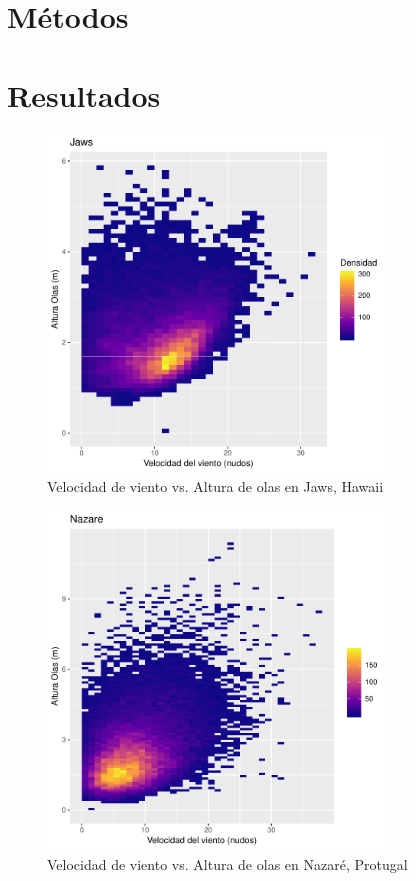 \section{Métodos}%
\label{sec:metodos}

\section{Resultados}%
\label{sec:resultados}



\begin{figure}[h]
  \caption{Velocidad de viento vs. Altura de olas en Jaws, Hawaii}
\centering
\includegraphics[width=0.8\textwidth]{./figures/jaws.pdf}
\end{figure}

\begin{figure}[h]
  \caption{Velocidad de viento vs. Altura de olas en Nazaré, Protugal}
\centering
\includegraphics[width=0.8\textwidth]{./figures/nazare.pdf}
\end{figure}



